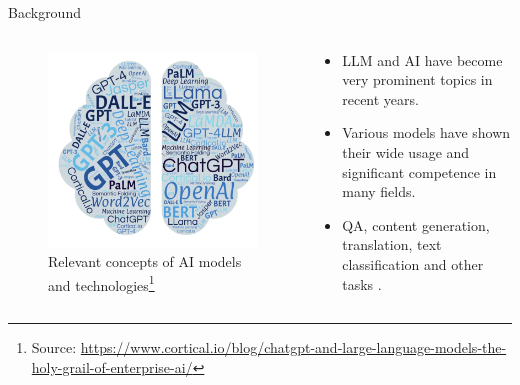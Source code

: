 \documentclass[t]{beamer}
\begin{document}
\begin{frame}{Background}
  \begin{columns}
    \begin{column}{0.4\textwidth}
        \begin{figure}
            \centering
            \includegraphics[width=\textwidth]{llm1.png}
            \caption{Relevant concepts of AI models and technologies\footnote{Source: \url{https://www.cortical.io/blog/chatgpt-and-large-language-models-the-holy-grail-of-enterprise-ai/}}}
            \label{fig:llm1}
        \end{figure}
    \end{column}
    \begin{column}{0.5\textwidth}
        \begin{itemize}
            \item LLM and AI have become very prominent topics in recent years.
            \item Various models have shown their wide usage and significant competence in many fields.
            \item QA, content generation, translation, text classification and other tasks \cite{Liu23}.
        \end{itemize}
    \end{column}
\end{columns}
\end{frame}
\end{document}
